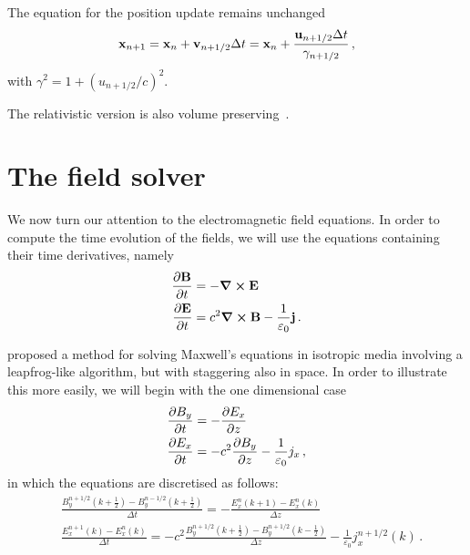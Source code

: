 \documentclass[12pt, class=report, crop=false]{standalone}
\begin{document}
The equation for the position update remains unchanged
\[
\vb{x}_{n+1} = \vb{x}_n + \vb{v}_{n+1/2}\Delta t =
\vb{x}_n + \frac{\vb{u}_{n+1/2}\Delta t}{\gamma_{n+1/2}}\,,
\]
with \(\gamma^2 = 1 + {\left(u_{n+1/2}/c\right)}^2\).

The relativistic version is also volume
preserving~\autocite{higuera_structurepreservingsecondorder_2017}.

\section{The field solver}

We now turn our attention to the electromagnetic field equations. In order to
compute the time evolution of the fields, we will use the equations containing
their time derivatives, namely
\begin{align}
  \pdv{\vb{B}}{t} & = - \curl{\vb{E}} \label{eq:faraday-law-for-yee} \\
  \pdv{\vb{E}}{t} & = c^2 \curl{\vb{B}} - \frac{1}{\varepsilon_0} \vb{j} \label{eq:ampere-law-for-yee}\,.
\end{align}

\Textcite{kaneyee_numericalsolution_1966} proposed a method for solving Maxwell's
equations in isotropic media involving a leapfrog-like algorithm, but with
staggering also in space. In order to illustrate this more easily, we will begin
with the one dimensional case
\begin{align*}
  \pdv{B_y}{t} & = - \pdv{E_x}{z} \\
  \pdv{E_x}{t} & = -c^2 \pdv{B_y}{z} - \frac{1}{\varepsilon_0} j_x \,,
\end{align*}
in which the equations are discretised as follows:
\begin{subequations}%
\label{eq:yee-1d}
\begin{align}
    &\frac{B_y^{n+1/2}(k+\frac{1}{2}) - B_y^{n-1/2}(k+\frac{1}{2})}{\Delta t} =
    - \frac{E_x^n(k+1) - E_x^n(k)}{\Delta z} \label{eq:yee-1d-faraday} \\
    &\frac{E_x^{n+1}(k) - E_x^{n}(k)}{\Delta t} =
    -c^2 \frac{B_y^{n+1/2}(k+\frac{1}{2}) - B_y^{n+1/2}(k-\frac{1}{2})}{\Delta z}
    -\frac{1}{\varepsilon_0} j_x^{n+1/2}(k) \label{eq:yee-1d-ampere} \,.
\end{align}
\end{subequations}
\end{document}

